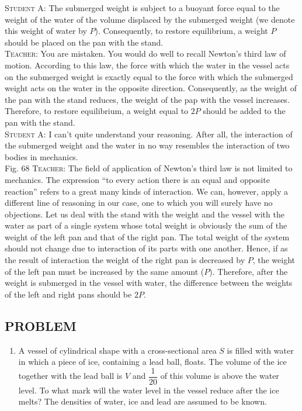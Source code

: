 \documentclass[a4paper,sfsidenotes]{tufte-book}
\begin{document}
\textsc{Student A:} The submerged weight is subject to a buoyant force equal to the weight of the water of the volume displaced by the submerged weight (we denote this weight of water by $P$). Consequently, to restore equilibrium, a weight $P$ should be placed on the pan with the stand.
\\
\textsc{Teacher:} You are mistaken. You would do well to recall Newton's third law of motion. According to this law, the force with which the water in the vessel acts on the submerged weight is exactly equal to the force with which the submerged weight acts on the water in the opposite direction. Consequently, as the weight of the pan with the stand reduces, the weight of the pap with the vessel increases. Therefore, to restore equilibrium, a weight equal to $2P$ should be added to the pan with the stand.
\\
\textsc{Student A:} I can't quite understand your reasoning. After all, the interaction of the submerged weight and the water in no way resembles the interaction of two bodies in mechanics.
\\
Fig. 68
\textsc{Teacher:} The field of application of Newton's third law is not limited to mechanics. The expression ``to every action there is an equal and opposite reaction'' refers to a great many kinds
of interaction. We can, however, apply a different line of reasoning in our case, one to which you will surely have no objections. Let us deal with the stand with the weight and the vessel with the water as part of a single system whose total weight is obviously the sum of the weight of the left pan and that of the right pan. The total weight of the system should not change due to interaction of its parts with one another. Hence, if as the result of interaction the weight of the right pan is decreased by $P$, the weight of the left pan must be increased by the same amount ($P$). Therefore, after the weight is submerged in the vessel with water, the difference between the weights of the left and right pans should be $2P$.

\subsection{PROBLEM}
\begin{enumerate}[resume=problems]
\item A vessel of cylindrical shape with a cross-sectional area $S$ is filled with water in which a piece of ice, containing a lead ball, floats. The volume of the ice together with the lead ball is $V$ and $\dfrac{1}{20}$ of this volume is above the water level. To what mark will the water level in the vessel reduce after the ice melts? The densities of water, ice and lead are assumed to be known.
\end{enumerate}
\end{document}
